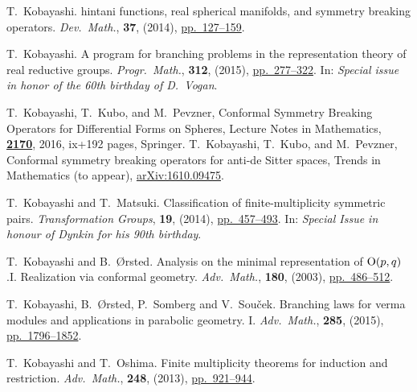 \documentclass[reqno,12pt]{pja00} %
\theoremstyle{plain}
\theoremstyle{definition}
\theoremstyle{exampstyle} \newtheorem{examp}[theorem]{Theorem}
\begin{document}
\begin{thebibliography}{14}
T.~Kobayashi.
hintani functions, real spherical manifolds, and
  symmetry breaking operators.
  \newblock \emph{{\normalfont Dev.~Math.}}, \textbf{37}, (2014),
 \href{http://dx.doi.org/10.4171/OWR/2014/3}{pp.~127--159}.

T.~Kobayashi.
\newblock A program for branching problems in the representation theory of real
  reductive groups.
\newblock \emph{{\normalfont Progr.~Math.}}, \textbf{312}, (2015), 
\href{http://dx.doi.org/10.1007/978-3-319-23443-4_10}{pp.~277--322}.
\newblock In: \emph{{\normalfont Special issue in honor of the 60th birthday
of D.~Vogan}}.


T.~Kobayashi, T.~Kubo, and M.~Pevzner,
\newblock 
Conformal Symmetry Breaking Operators for Differential Forms on Spheres,
Lecture Notes in Mathematics, \href{http://dx.doi.org/10.1007/978-981-10-2657-7}{\textbf{2170}}, 2016, ix+192 pages,
Springer.
T.~Kobayashi, T.~Kubo, and M.~Pevzner,
\newblock 
Conformal symmetry breaking operators for anti-de Sitter spaces,
Trends in Mathematics (to appear), 
\href{https://arxiv.org/abs/1610.09475}{arXiv:1610.09475}.

T.~Kobayashi and T.~Matsuki.
\newblock Classification of finite-multiplicity symmetric pairs.
\newblock \emph{{\normalfont Transformation Groups}}, \textbf{19}, (2014),
\href{http://dx.doi.org/10.1007/s00031-014-9265-x}{pp.~457--493}.
\newblock In: \emph{{\normalfont Special Issue in honour of Dynkin
  for his 90th birthday}}.


T.~Kobayashi and B.~{\O}rsted.
\newblock Analysis on the minimal representation of\/ {${\rm
  O}(p,q)$}.{\;}{{\rm{I}}. Realization via conformal geometry}.
\newblock \emph{\normalfont Adv.~Math.}, \textbf{180}, (2003),
\href{http://dx.doi.org/10.1016/S0001-8708(03)00012-4}{pp.~486--512}.

T.~Kobayashi, B.~{\O}rsted, P.~Somberg and V.~Sou{\v{c}}ek.
\newblock Branching laws for verma modules and applications in parabolic
  geometry. {I}.
\newblock \emph{{\normalfont Adv.~Math.}}, \textbf{285}, (2015),
\href{http://dx.doi.org/10.1016/j.aim.2015.08.020}{pp.~1796--1852}.

T.~Kobayashi and T.~Oshima.
\newblock Finite multiplicity theorems for induction and restriction.
\newblock \emph{{\normalfont Adv.~Math.}}, \textbf{248}, (2013), 
 \href{http://dx.doi.org/10.1016/j.aim.2013.07.015}{pp.~921--944}.


\end{thebibliography}
\end{document}

